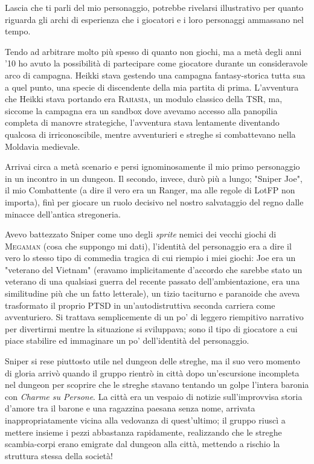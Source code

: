 
Lascia che ti parli del mio personaggio, potrebbe rivelarsi illustrativo per quanto riguarda gli archi di esperienza che i giocatori e i loro personaggi ammassano nel tempo.

Tendo ad arbitrare molto più spesso di quanto non giochi, ma a metà degli anni '10 ho avuto la possibilità di partecipare come giocatore durante un consideravole arco di campagna. Heikki stava gestendo una campagna fantasy-storica tutta sua a quel punto, una specie di discendente della mia partita di prima. L'avventura che Heikki stava portando era \textsc{Rahasia}, un modulo classico della TSR, ma, siccome la campagna era un sandbox dove avevamo accesso alla panopilia completa di manovre strategiche, l'avventura stava lentamente diventando qualcosa di irriconoscibile, mentre avventurieri e streghe si combattevano nella Moldavia medievale.

Arrivai circa a metà scenario e persi ignominosamente il mio primo personaggio in un incontro in un dungeon. Il secondo, invece, durò più a lungo; "Sniper Joe", il mio Combattente (a dire il vero era un Ranger, ma alle regole di LotFP non importa), finì per giocare un ruolo decisivo nel nostro salvataggio del regno dalle minacce dell'antica stregoneria.

Avevo battezzato Sniper come uno degli \textit{sprite} nemici dei vecchi giochi di \textsc{Megaman} (cosa che suppongo mi dati), l'identità del personaggio era a dire il vero lo stesso tipo di commedia tragica di cui riempio i miei giochi: Joe era un "veterano del Vietnam" (eravamo implicitamente d'accordo che sarebbe stato un veterano di una qualsiasi guerra del recente passato dell'ambientazione, era una similitudine più che un fatto letterale), un tizio taciturno e paranoide che aveva trasformato il proprio PTSD in un'autodistruttiva seconda carriera come avventuriero. Si trattava semplicemente di un po' di leggero riempitivo narrativo per divertirmi mentre la situazione si sviluppava; sono il tipo di giocatore a cui piace stabilire ed immaginare un po' dell'identità del personaggio.

Sniper si rese piuttosto utile nel dungeon delle streghe, ma il suo vero momento di gloria arrivò quando il gruppo rientrò in città dopo un'escursione incompleta nel dungeon per scoprire che le streghe stavano tentando un golpe l'intera baronia con \textit{Charme su Persone}. La città era un vespaio di notizie sull'improvvisa storia d'amore tra il barone e una ragazzina paesana senza nome, arrivata inappropriatamente vicina alla vedovanza di quest'ultimo; il gruppo riuscì a mettere insieme i pezzi abbastanza rapidamente, realizzando che le streghe scambia-corpi erano emigrate dal dungeon alla città, mettendo a rischio la struttura stessa della società!

